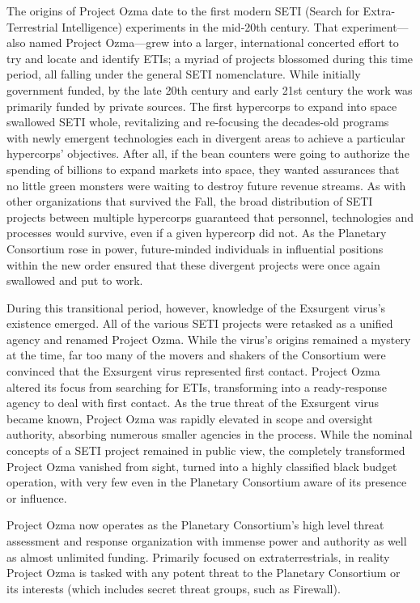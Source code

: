 The origins of Project Ozma date to the first modern 
SETI (Search for Extra-Terrestrial Intelligence) experiments
in the mid-20th century. That experiment—also
named Project Ozma—grew into a larger, international 
concerted effort to try and locate and identify ETIs; a 
myriad of projects blossomed during this time period, 
all falling under the general SETI nomenclature. While 
initially government funded, by the late 20th century 
and early 21st century the work was primarily funded 
by private sources. 
The first hypercorps to expand into space swallowed
SETI whole, revitalizing and re-focusing the
decades-old programs with newly emergent technologies
each in divergent areas to achieve a particular
hypercorps' objectives. After all, if the bean counters 
were going to authorize the spending of billions to 
expand markets into space, they wanted assurances 
that no little green monsters were waiting to destroy 
future revenue streams. 
As with other organizations that survived the Fall, 
the broad distribution of SETI projects between 
multiple hypercorps guaranteed that personnel, technologies
and processes would survive, even if a given
hypercorp did not. As the Planetary Consortium rose 
in power, future-minded individuals in influential positions
within the new order ensured that these divergent
projects were once again swallowed and put to work. 

During this transitional period, however, knowledge
of the Exsurgent virus's existence emerged. All
of the various SETI projects were retasked as a unified 
agency and renamed Project Ozma. While the virus's 
origins remained a mystery at the time, far too many 
of the movers and shakers of the Consortium were 
convinced that the Exsurgent virus represented first 
contact. Project Ozma altered its focus from searching 
for ETIs, transforming into a ready-response agency to 
deal with first contact. As the true threat of the Exsurgent
virus became known, Project Ozma was rapidly
elevated in scope and oversight authority, absorbing 
numerous smaller agencies in the process. While the 
nominal concepts of a SETI project remained in public 
view, the completely transformed Project Ozma vanished
from sight, turned into a highly classified black
budget operation, with very few even in the Planetary 
Consortium aware of its presence or influence. 

Project Ozma now operates as the Planetary Consortium's
high level threat assessment and response
organization with immense power and authority as 
well as almost unlimited funding. Primarily focused 
on extraterrestrials, in reality Project Ozma is tasked 
with any potent threat to the Planetary Consortium 
or its interests (which includes secret threat groups, 
such as Firewall). 

